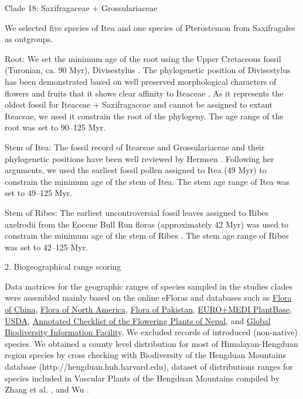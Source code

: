 \documentclass[10pt]{article}
\begin{document}
Clade 18: Saxifragaceae + Grossulariaceae

We selected five species of Itea and one species of Pterostemon from
Saxifragales as outgroups. 

Root: We set the minimum age of the root using the Upper Cretaceous
fossil (Turonian, ca. 90 Myr), Divisestylus \citep{Hermsen2003}. The
phylogenetic position of Divisestylus has been demonstrated based on
well preserved morphological characters of flowers and fruits that it
shows clear affinity to Iteaceae \citep{Hermsen2003}. As it represents
the oldest fossil for Iteaceae + Saxifragaceae and cannot be assigned
to extant Iteaceae, we used it constrain the root of the
phylogeny. The age range of the root was set to 90--125 Myr.

Stem of Itea: The fossil record of Iteaceae and Grossulariaceae and
their phylogenetic positions have been well reviewed by Hermsen
\citep{Hermsen2013}. Following her arguments, we used the earliest
fossil pollen assigned to Itea (49 Myr) to constrain the minimum age
of the stem of Itea. The stem age range of Itea was set to 49--125
Myr.

Stem of Ribes: The earliest uncontroversial fossil leaves assigned to
Ribes axelrodii from the Eocene Bull Run floras (approximately 42 Myr)
was used to constrain the minimum age of the stem of Ribes
\citep{Hermsen2005}. The stem age range of Ribes was set to 42--125
Myr.

2. Biogeographical range scoring

Data matrices for the geographic ranges of species sampled in the
studies clades were assembled mainly based on the online eFloras and
databases such as
\href{http://www.efloras.org/flora_page.aspx?flora_id=2}{Flora of
  China}, \href{http://floranorthamerica.org}{Flora of North America},
\href{http://www.efloras.org/flora_page.aspx?flora_id=5}{Flora of
  Pakistan}, \href{http://www.emplantbase.org}{EURO+MEDI PlantBase},
\href{http://plants.usda.gov}{USDA},
\href{http://www.efloras.org/flora_page.aspx?flora_id=110}{Annotated
  Checklist of the Flowering Plants of Nepal}, and
\href{http://www.gbif.org}{Global Biodiversity Information
  Facility}. We excluded records of introduced (non-native)
species. We obtained a county level distribution for most of
Himalayan-Hengduan region species by cross checking with Biodiversity
of the Hengduan Mountains database (http://hengduan.huh.harvard.edu),
dataset of distributions ranges for species included in Vascular
Plants of the Hengduan Mountains compiled by Zhang et
al. \citep{Zhang2009}, and Wu \citep{Wu2008}.
\end{document}
